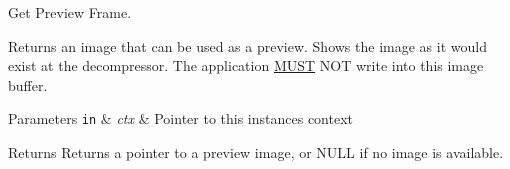 Get Preview Frame. 

Returns an image that can be used as a preview. Shows the image as it would exist at the decompressor. The application \hyperlink{rfc2119_MUST}{M\+U\+ST} N\+OT write into this image buffer.


\begin{DoxyParams}[1]{Parameters}
\mbox{\tt in}  & {\em ctx} & Pointer to this instance\textquotesingle{}s context\\
\hline
\end{DoxyParams}
\begin{DoxyReturn}{Returns}
Returns a pointer to a preview image, or N\+U\+LL if no image is available. 
\end{DoxyReturn}
